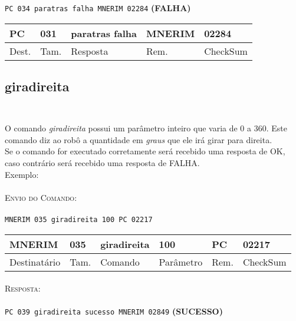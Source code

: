 \documentclass[11pt,	 papera4]{article}
\begin{document}
\hspace*{1.2cm} \texttt{PC 034 paratras falha MNERIM 02284} \hspace*{2.5cm}\textbf{(FALHA)}

\begin{table}[h]
	\centering
	\begin{tabular}{p{1cm}p{1cm}p{3cm}p{2cm}p{2cm}}
		\toprule
		PC & 031 &paratras falha  & MNERIM & 02284 \\
		\midrule	
		Dest. & Tam. & Resposta & Rem. & CheckSum \\
		\bottomrule
	\end{tabular}
	\label{tab:formatoslatex} %
\end{table}

\newpage 

\subsection*{giradireita \\\\}
O comando \textit{giradireita} possui um parâmetro inteiro que varia de 0 a 360.  
Este comando diz ao robô a quantidade em \textit{graus} que ele irá girar para direita.\\
Se o comando for executado corretamente será recebido uma resposta de OK, caso contrário será recebido uma resposta de FALHA. \\
\newline
Exemplo: \\\\ \hspace*{0.5cm} 
\textsc{Envio do Comando:} \\\\ \hspace*{2cm} \texttt{MNERIM 035 giradireita 100 PC 02217} \\

\begin{table}[h]
	\centering
	\begin{tabular}{p{2cm}p{1cm}p{2cm}p{2cm}p{1cm}p{2cm}}
		\toprule
		MNERIM & 035 & giradireita & 100 & PC & 02217 \\
		\midrule	
		Destinatário & Tam. & Comando & Parâmetro &Rem. & CheckSum \\
		\bottomrule
	\end{tabular}
	\label{tab:formatoslatex} %
\end{table}

\paragraph*{\newline\newline}
\hspace*{0.8cm}\textsc{Resposta:} \\\\ \hspace*{2cm}\texttt{PC 039 giradireita sucesso MNERIM 02849} \hspace*{2cm}\textbf{(SUCESSO)}
\end{document}
